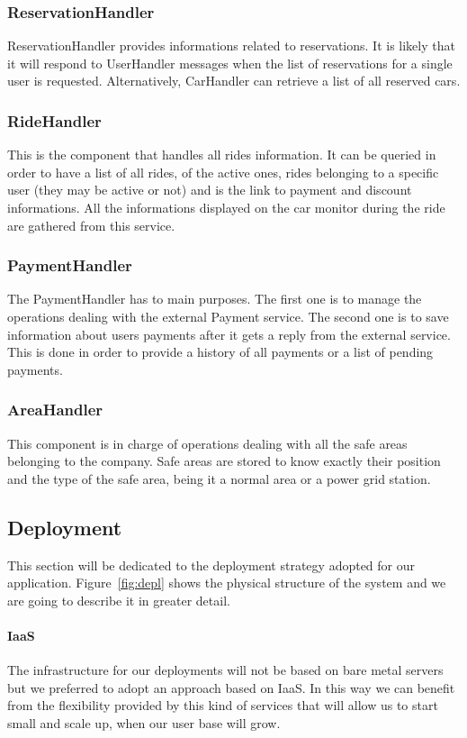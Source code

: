 \subsubsection{ReservationHandler}
ReservationHandler provides informations related to reservations. It is likely that it will
respond to UserHandler messages when the list of reservations for a single user is requested.
Alternatively, CarHandler can retrieve a list of all reserved cars. 

\subsubsection{RideHandler}
This is the component that handles all rides information. It can be queried in order to have
a list of all rides, of the active ones, rides belonging to a specific user
(they may be active or not) and is the link to payment and discount informations. All the informations
displayed on the car monitor during the ride are gathered from this service.

\subsubsection{PaymentHandler}
The PaymentHandler has to main purposes. The first one is to manage the operations dealing
with the external Payment service. The second one is to save information about users payments
after it gets a reply from the external service. 
This is done in order to provide a history of all payments or a list of pending payments.


\subsubsection{AreaHandler}
This component is in charge of operations dealing with all the safe areas belonging to the company.
Safe areas are stored to know exactly their position and the type of the safe area, being it
a normal area or a power grid station.

\pagebreak

\subsection{Deployment}
This section will be dedicated to the deployment strategy adopted for our application. Figure~\ref{fig:depl}
shows the physical structure of the system and we are going to describe it in greater detail.

\paragraph{IaaS} The infrastructure for our deployments will not be based on bare metal servers
but we preferred to adopt an approach based on IaaS. In this way we can benefit from the
flexibility provided by this kind of services that will allow us to start small and scale
up, when our user base will grow.  

